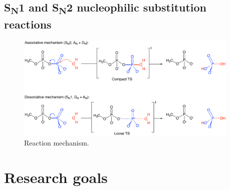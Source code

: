 \subsection{S\textsubscript{N}1 and S\textsubscript{N}2 nucleophilic substitution reactions}

\begin{figure}[htbp]
    \centering
    \includegraphics[width=0.95\textwidth]{Figures/1_Introduction/intro_reaction_mechanism.pdf}
    \caption{Reaction mechanism.}
    \label{fig:reaction-mechanism}
\end{figure}


\section{Research goals}



